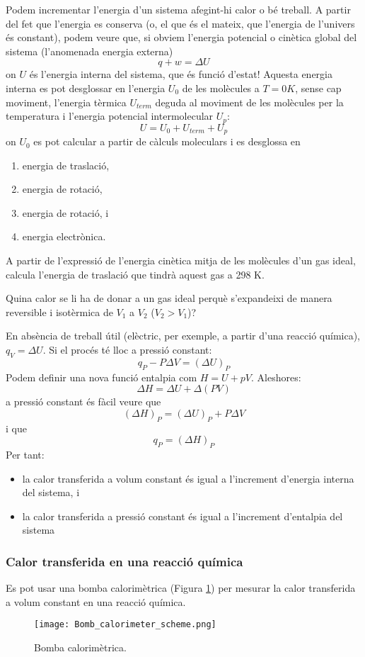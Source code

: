 Podem incrementar l'energia d'un sistema afegint-hi calor o bé treball. A partir del fet que l'energia es conserva (o, el que és el mateix, que l'energia de l'univers és constant), podem veure que, si obviem l'energia potencial o cinètica global del sistema (l'anomenada energia externa) 
\[
q+w=\Delta U
\]
on $U$ és l'energia interna del sistema, que és funció d'estat!
Aquesta energia interna es pot desglossar en l'energia $U_0$ de les molècules a $T=0K$, sense cap moviment, l'energia tèrmica $U_{term}$ deguda al moviment de les molècules per la temperatura i l'energia potencial intermolecular $U_p$:
\[
U=U_0+U_{term}+U_p
\]
on $U_0$ es pot calcular a partir de càlculs moleculars i es desglossa en 
\begin{enumerate}
\item energia de traslació,
\item energia de rotació,
\item energia de rotació, i 
\item energia electrònica.
\end{enumerate}
\begin{exr}
A partir de l'expressió de l'energia cinètica mitja de les molècules d'un gas ideal, calcula l'energia de traslació que tindrà aquest gas a 298 K.
\end{exr}
\begin{exr}
Quina calor se li ha de donar a un gas ideal perquè s'expandeixi de manera reversible i isotèrmica de $V_1$ a $V_2$ ($V_2>V_1$)?
\end{exr}
En absència de treball útil (elèctric, per exemple, a partir d'una reacció química), $q_V=\Delta U$.
Si el procés té lloc a pressió constant:
\[
q_P  -P\Delta V = (\Delta U)_P
\]
Podem definir una nova funció entalpia com $H=U+pV$.
Aleshores:
\[
\Delta H = \Delta U + \Delta(PV)
\]
a pressió constant és fàcil veure que
\[
(\Delta H)_P = (\Delta U)_P + P\Delta V
\]
i que 
\[
q_P=(\Delta H)_P 
\]
Per tant:
\begin{itemize}
\item la calor transferida a volum constant és igual a l'increment d'energia interna del sistema, i
\item la calor transferida a pressió constant és igual a l'increment d'entalpia  del sistema
\end{itemize}

\subsubsection{Calor transferida en una reacció química}
Es pot usar una bomba calorimètrica (Figura \ref{fig:Bomb_calorimeter_scheme}) per mesurar la calor transferida a volum constant en una reacció química.
\begin{figure}[h]
\centering
\texttt{[image: Bomb\_calorimeter\_scheme.png]}
\caption{Bomba calorimètrica.}
\label{fig:Bomb_calorimeter_scheme}
\end{figure}

